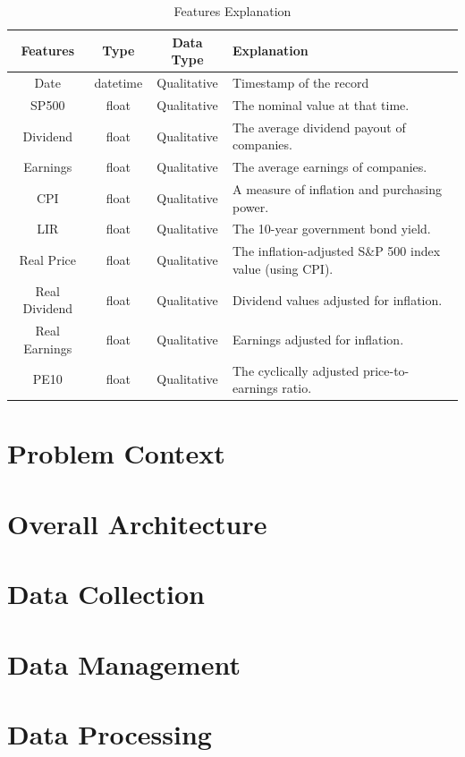 \documentclass[a4paper,12pt]{report}
\begin{document}
\begin{table}[H]
\centering
\begin{adjustbox}{width=\textwidth}
\begin{tabular}{|c|c|c|l|}
\hline
\textbf{Features} & \textbf{Type} & \textbf{Data Type} & \textbf{Explanation}\\
\hline Date & datetime & Qualitative  & Timestamp of the record \\ \hline
\hline SP500  & float & Qualitative  & The nominal value at that time. \\ \hline
\hline Dividend & float & Qualitative  & The average dividend payout of companies. \\ \hline
\hline Earnings & float & Qualitative  & The average earnings of companies. \\ \hline
\hline CPI & float & Qualitative  & A measure of inflation and purchasing power. \\ \hline
\hline LIR & float & Qualitative  & The 10-year government bond yield. \\ \hline
\hline Real Price & float & Qualitative  & The inflation-adjusted S\&P 500 index value (using CPI). \\ \hline
\hline Real Dividend & float & Qualitative  & Dividend values adjusted for inflation. \\ \hline
\hline Real Earnings & float & Qualitative  & Earnings adjusted for inflation. \\ \hline
\hline PE10 & float & Qualitative  & The cyclically adjusted price-to-earnings ratio. \\ \hline
\end{tabular}
\end{adjustbox}
\caption{Features Explanation}
\end{table}
\section{Problem Context}
\section{Overall Architecture}
\section{Data Collection}
\section{Data Management}
\section{Data Processing}
\end{document}
